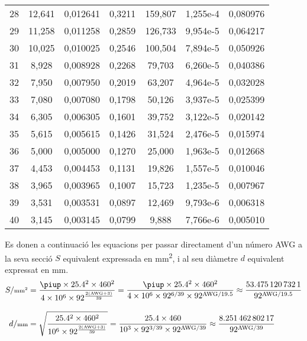 \begin{longtable}{S[table-format=4.0]S[table-format=3.3]
                  S[table-format=2.6]S[table-format=2.4]
                  S[table-format=6.3]S[table-format=1.3e1]
                  S[table-format=3.6]}
28 &     12,641 &   0,012641 &     0,3211 &    159,807 &  1,255e-4 &   0,080976 \\
29 &     11,258 &   0,011258 &     0,2859 &    126,733 &  9,954e-5 &   0,064217 \\
30 &     10,025 &   0,010025 &     0,2546 &    100,504 &  7,894e-5 &   0,050926 \\
31 &      8,928 &   0,008928 &     0,2268 &     79,703 &  6,260e-5 &   0,040386 \\
32 &      7,950 &   0,007950 &     0,2019 &     63,207 &  4,964e-5 &   0,032028 \\
33 &      7,080 &   0,007080 &     0,1798 &     50,126 &  3,937e-5 &   0,025399 \\
34 &      6,305 &   0,006305 &     0,1601 &     39,752 &  3,122e-5 &   0,020142 \\
35 &      5,615 &   0,005615 &     0,1426 &     31,524 &  2,476e-5 &   0,015974 \\
36 &      5,000 &   0,005000 &     0,1270 &     25,000 &  1,963e-5 &   0,012668 \\
37 &      4,453 &   0,004453 &     0,1131 &     19,826 &  1,557e-5 &   0,010046 \\
38 &      3,965 &   0,003965 &     0,1007 &     15,723 &  1,235e-5 &   0,007967 \\
39 &      3,531 &   0,003531 &     0,0897 &     12,469 &  9,793e-6 &   0,006318 \\
40 &      3,145 &   0,003145 &     0,0799 &      9,888 &  7,766e-6 &   0,005010 \\
\bottomrule[1pt]
\end{longtable}

 Es donen a continuació les equacions per passar directament d'un número AWG a la seva secció $S$ equivalent expressada en \si{mm^2}, i al seu diàmetre $d$ equivalent expressat en \si{mm}.
\begin{align}
   S/{\scriptstyle\si{mm^2}}  &= \frac{ \piup \times \num{25,4}^2 \times 460^2}{4 \times 10^6 \times 92^{\frac{2(\text{AWG}+3)}{39}}} =
   \frac{ \piup \times \num{25,4}^2 \times 460^2}{4 \times 10^6 \times 92^{6/39} \times 92^{\text{AWG}/\num{19,5}}} \approx
   \frac{\num{53,4751207321}}{92^{\text{AWG}/\num{19,5}}}\label{eq:awg_mm2}\\[2ex]
   d/{\scriptstyle\si{mm}}  &= \sqrt{\frac{\num{25,4}^2 \times 460^2}{10^6 \times 92^{\frac{2(\text{AWG}+3)}{39}}}} =
   \frac{\num{25,4} \times 460}{10^3 \times 92^{3/39} \times 92^{\text{AWG}/39}} \approx
   \frac{\num{8,25146280217}}{92^{\text{AWG}/39}}\label{eq:awg_mm}
\end{align}

